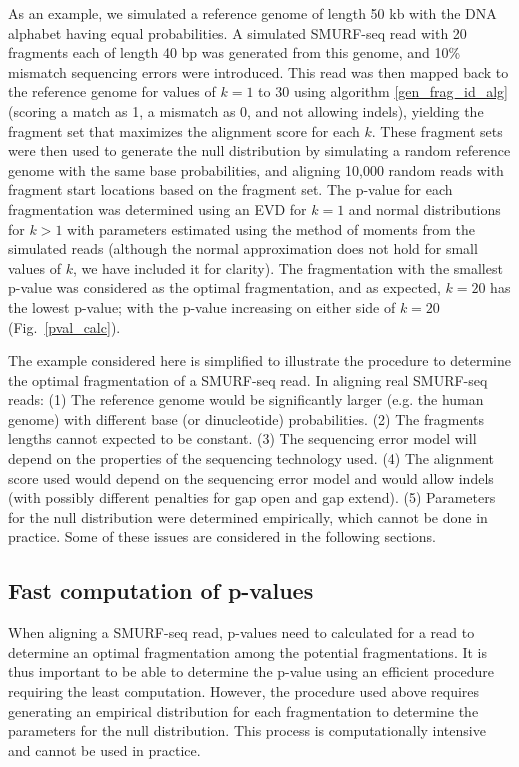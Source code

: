 As an example, we simulated a reference genome of length 50 kb with the
DNA alphabet having equal probabilities.
%
A simulated SMURF-seq read with 20 fragments each of length 40 bp was
generated from this genome, and 10\% mismatch sequencing errors were
introduced.
%
This read was then mapped back to the reference genome for values of $k
= 1$ to $30$ using algorithm \ref{gen_frag_id_alg} (scoring a match as
1, a mismatch as 0, and not allowing indels), yielding the fragment set
that maximizes the alignment score for each $k$.
%
These fragment sets were then used to generate the null distribution by
simulating a random reference genome with the same base probabilities,
and aligning 10,000 random reads with fragment start locations based on
the fragment set.
%
The p-value for each fragmentation was determined using an EVD for $k=1$
and normal distributions for $k > 1$ with parameters estimated using the
method of moments from the simulated reads (although the normal
approximation does not hold for small values of $k$, we have included it
for clarity).
%
The fragmentation with the smallest p-value was considered as the
optimal fragmentation, and as expected, $k = 20$ has the lowest p-value;
with the p-value increasing on either side of $k = 20$
(Fig.~\ref{pval_calc}).

The example considered here is simplified to illustrate the procedure
to determine the optimal fragmentation of a SMURF-seq read. In aligning
real SMURF-seq reads: (1) The reference genome would be significantly
larger (e.g. the human genome) with different base (or dinucleotide)
probabilities. (2) The fragments lengths cannot expected to be constant.
(3) The sequencing error model will depend on the properties of the
sequencing technology used. (4) The alignment score used would depend on
the sequencing error model and would allow indels (with possibly
different penalties for gap open and gap extend). (5) Parameters for the
null distribution were determined empirically, which cannot be done in
practice. Some of these issues are considered in the following sections.

\subsection{Fast computation of p-values}
\label{fast_pval_comp}
When aligning a SMURF-seq read, p-values need to calculated for a read
to determine an optimal fragmentation among the potential
fragmentations. It is thus important to be able to determine the p-value
using an efficient procedure requiring the least computation.
%
However, the procedure used above requires generating an empirical
distribution for each fragmentation to determine the parameters for the
null distribution. This process is computationally intensive and cannot
be used in practice.

